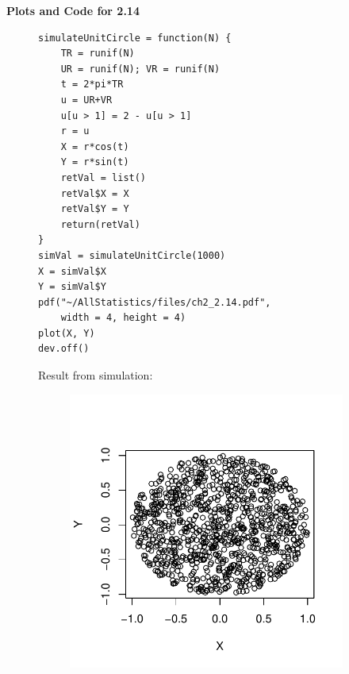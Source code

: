 \newpage\noindent
\textbf{Plots and Code for 2.14}
\begin{figure}[H]
    \begin{minipage}[t]{0.5\textwidth}
    \begin{lstlisting}[style=RSyntax]
simulateUnitCircle = function(N) {  
    TR = runif(N)
    UR = runif(N); VR = runif(N)
    t = 2*pi*TR
    u = UR+VR
    u[u > 1] = 2 - u[u > 1]
    r = u
    X = r*cos(t)
    Y = r*sin(t)
    retVal = list()
    retVal$X = X 
    retVal$Y = Y
    return(retVal)
}
simVal = simulateUnitCircle(1000)
X = simVal$X
Y = simVal$Y
pdf("~/AllStatistics/files/ch2_2.14.pdf",
    width = 4, height = 4)
plot(X, Y)
dev.off()
    \end{lstlisting}
    \rule{0pt}{55pt}
\end{minipage}
\begin{minipage}[t]{0.5\textwidth}
\qquad Result from simulation:
    \begin{center}
        \begin{figure}[H]
        \includegraphics[scale=0.65]{ch2_2.14.pdf}
        \end{figure}
    \end{center}
\end{minipage} \\
    \begin{minipage}{0.5\textwidth}

\end{minipage}
\end{figure}
